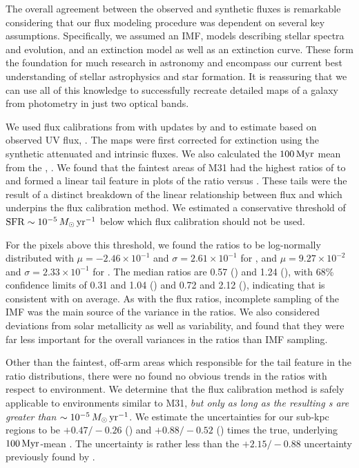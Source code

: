 \documentclass[iop, tighten]{emulateapj}
\begin{document}
The overall agreement between the observed and synthetic fluxes is remarkable
considering that our flux modeling procedure was dependent on several key
assumptions. Specifically, we assumed an IMF, models describing stellar spectra
and evolution, and an extinction model as well as an extinction curve. These
form the foundation for much research in astronomy and encompass our current
best understanding of stellar astrophysics and star formation. It is reassuring
that we can use all of this knowledge to successfully recreate detailed maps of
a galaxy from photometry in just two optical bands.

We used flux calibrations from \citet{Kennicutt:1998} with updates by
\citet{Hao:2011} and \citet{Murphy:2011} to estimate  based on observed
UV flux, \sfrx{}. The \fxobs{} maps were first corrected for extinction using
the synthetic attenuated and intrinsic fluxes. We also calculated the $100\,\mathrm{Myr}$
mean \sfr{} from the , \sfroneh{}. We found that the faintest areas of
M31 had the highest ratios of \sfrx{} to \sfroneh{} and formed a linear tail
feature in plots of the \sfr{} ratio versus \sfroneh{}. These tails were the
result of a distinct breakdown of the linear relationship between flux and
\sfr{} which underpins the flux calibration method. We estimated a conservative
threshold of $\mathrm{SFR} \sim 10^{-5}\,M_\odot\,\mathrm{yr}^{-1}$ below which flux calibration
should not be used.

For the pixels above this threshold, we found the \sfr{} ratios to be
log-normally distributed with $\mu = -2.46\times 10^{-1}$ and $\sigma =
2.61\times 10^{-1}$ for \fuv{}, and $\mu = 9.27\times 10^{-2}$ and $\sigma =
2.33\times 10^{-1}$ for \nuv{}. The median ratios are 0.57 (\fuv{}) and 1.24
(\nuv{}), with 68\% confidence limits of 0.31 and 1.04 (\fuv{}) and 0.72 and
2.12 (\nuv{}), indicating that \sfrx{} is consistent with \sfroneh{} on
average. As with the flux ratios, incomplete sampling of the IMF was the main
source of the variance in the \sfr{} ratios. We also considered deviations from
solar metallicity as well as \sfh{} variability, and found that they were far
less important for the overall variances in the \sfr{} ratios than IMF
sampling.

Other than the faintest, off-arm areas which responsible for the tail feature
in the \sfr{} ratio distributions, there were no found no obvious trends in the
\sfr{} ratios with respect to environment. We determine that the flux
calibration method is safely applicable to environments similar to M31,
\emph{but only as long as the resulting \sfr{}s are greater than $\sim
10^{-5}\,M_\odot\,\mathrm{yr}^{-1}$}. We estimate the \sfr{} uncertainties for our sub-kpc
regions to be $+\!0.47/\!-\!0.26$ (\fuv{}) and $+\!0.88/\!-\!0.52$ (\nuv{})
times the true, underlying $100\,\mathrm{Myr}$-mean \sfr{}. The \sfrfuv{} uncertainty is
rather less than the $+\!2.15/\!-\!0.88$ uncertainty previously found by
\citet{Simones:2014}.
\end{document}
